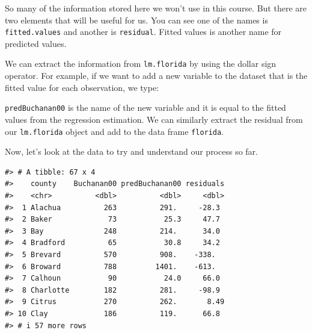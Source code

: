 \documentclass[
]{book}
\newenvironment{Shaded}{\begin{snugshade}}{\end{snugshade}}
\newcommand{\NormalTok}[1]{#1}
\newcommand{\OtherTok}[1]{\textcolor[rgb]{0.56,0.35,0.01}{#1}}
\newcommand{\SpecialCharTok}[1]{\textcolor[rgb]{0.81,0.36,0.00}{\textbf{#1}}}
\begin{document}
So many of the information stored here we won't use in this course. But there are two elements that will be useful for us. You can see one of the names is \texttt{fitted.values} and another is \texttt{residual}. Fitted values is another name for predicted values.

We can extract the information from \texttt{lm.florida} by using the dollar sign operator. For example, if we want to add a new variable to the dataset that is the fitted value for each observation, we type:

\begin{Shaded}
\end{Shaded}

\texttt{predBuchanan00} is the name of the new variable and it is equal to the fitted values from the regression estimation. We can similarly extract the residual from our \texttt{lm.florida} object and add to the data frame \texttt{florida}.

\begin{Shaded}
\end{Shaded}

Now, let's look at the data to try and understand our process so far.

\begin{verbatim}
#> # A tibble: 67 x 4
#>    county    Buchanan00 predBuchanan00 residuals
#>    <chr>          <dbl>          <dbl>     <dbl>
#>  1 Alachua          263          291.     -28.3 
#>  2 Baker             73           25.3     47.7 
#>  3 Bay              248          214.      34.0 
#>  4 Bradford          65           30.8     34.2 
#>  5 Brevard          570          908.    -338.  
#>  6 Broward          788         1401.    -613.  
#>  7 Calhoun           90           24.0     66.0 
#>  8 Charlotte        182          281.     -98.9 
#>  9 Citrus           270          262.       8.49
#> 10 Clay             186          119.      66.8 
#> # i 57 more rows
\end{verbatim}
\end{document}
